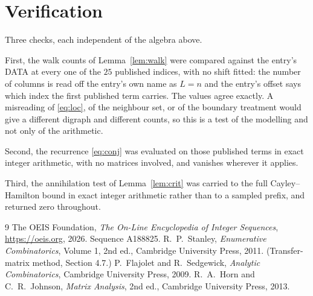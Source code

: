 \documentclass[11pt,a4paper]{article}
\theoremstyle{plain}
\theoremstyle{definition}
\begin{document}
\section{Verification}

Three checks, each independent of the algebra above.

First, the walk counts of Lemma~\ref{lem:walk} were compared against the entry's DATA at
every one of the $25$ published indices, with no shift fitted: the number of columns is
read off the entry's own name as $L=n$ and the entry's offset says which index the first
published term carries. The values agree exactly. A misreading of \eqref{eq:loc}, of the
neighbour set, or of the boundary treatment would give a different digraph and different
counts, so this is a test of the modelling and not only of the arithmetic.

Second, the recurrence \eqref{eq:conj} was evaluated on those published terms in exact
integer arithmetic, with no matrices involved, and vanishes wherever it applies.

Third, the annihilation test of Lemma~\ref{lem:crit} was carried to the full
Cayley--Hamilton bound in exact integer arithmetic rather than to a sampled prefix, and
returned zero throughout.

\begin{thebibliography}{9}
 The OEIS Foundation, \emph{The On-Line Encyclopedia of Integer
Sequences}, \url{https://oeis.org}, 2026. Sequence A188825.
 R.~P.~Stanley, \emph{Enumerative Combinatorics}, Volume 1, 2nd ed.,
Cambridge University Press, 2011. (Transfer-matrix method, Section 4.7.)
 P.~Flajolet and R.~Sedgewick, \emph{Analytic Combinatorics}, Cambridge
University Press, 2009.
 R.~A.~Horn and C.~R.~Johnson, \emph{Matrix Analysis}, 2nd ed., Cambridge
University Press, 2013.
\end{thebibliography}
\end{document}
